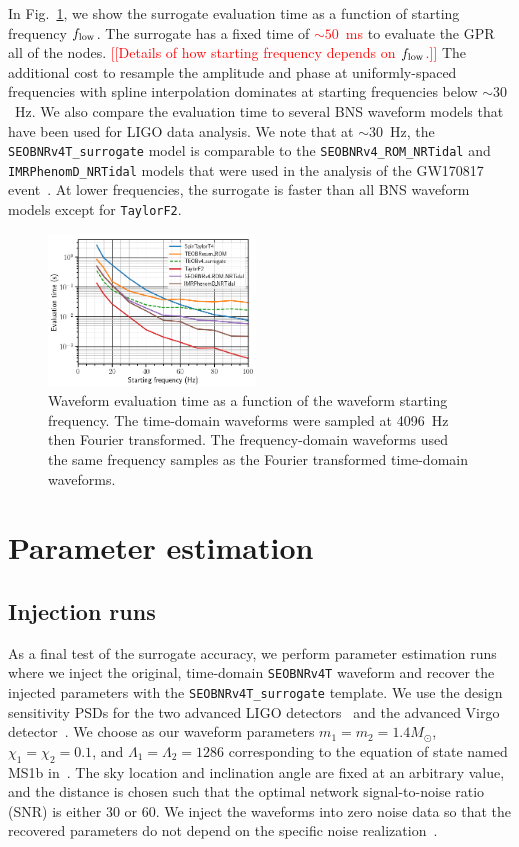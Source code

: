 \documentclass[prd,aps,letter,twocolumn,floatfix,notitlepage,nofootinbib]{revtex4-1}
\newcommand{\red}[1]{\textcolor{red}{#1}}
\begin{document}
In Fig.~\ref{fig:timing}, we show the surrogate evaluation time as a function of starting frequency $f_{\rm low}$. The surrogate has a fixed time of \red{$\sim 50$~ms} to evaluate the GPR all of the nodes. \red{[[Details of how starting frequency depends on $f_{\rm low}$.]]} The additional cost to resample the amplitude and phase at uniformly-spaced frequencies with spline interpolation dominates at starting frequencies below $\sim 30$~Hz. We also compare the evaluation time to several BNS waveform models that have been used for LIGO data analysis. We note that at $\sim 30$~Hz, the \texttt{SEOBNRv4T\_surrogate} model is comparable to the \texttt{SEOBNRv4\_ROM\_NRTidal} and \texttt{IMRPhenomD\_NRTidal} models that were used in the analysis of the GW170817 event~\cite{BNSPE}. At lower frequencies, the surrogate is faster than all BNS waveform models except for \texttt{TaylorF2}. 

\begin{figure}[htb]
\centering
\includegraphics[width=0.49\textwidth]{timing.png}
\caption{Waveform evaluation time as a function of the waveform starting frequency. The time-domain waveforms
were sampled at 4096~Hz then Fourier transformed. The frequency-domain waveforms used the
same frequency samples as the Fourier transformed time-domain waveforms.}
\label{fig:timing}
\end{figure}

\section{Parameter estimation}
\label{sec:pe}

\subsection{Injection runs}

As a final test of the surrogate accuracy, we perform parameter estimation runs where we inject the original, time-domain \texttt{SEOBNRv4T} waveform and recover the injected parameters with the \texttt{SEOBNRv4T\_surrogate} template. We use the design sensitivity PSDs for the two advanced LIGO detectors~\cite{Aasi:2013wya} and the advanced Virgo detector~\cite{virgoPSD}. We choose as our waveform parameters $m_1=m_2=1.4M_\odot$, $\chi_1=\chi_2=0.1$, and $\Lambda_1=\Lambda_2=1286$ corresponding to the equation of state named MS1b in~\cite{ReadLackey2009}. The sky location and inclination angle are fixed at an arbitrary value, and the distance is chosen such that the optimal network signal-to-noise ratio (SNR) is either 30 or 60. We inject the waveforms into zero noise data so that the recovered parameters do not depend on the specific noise realization~\cite{NissankeHolzHughes2010}.
\end{document}
